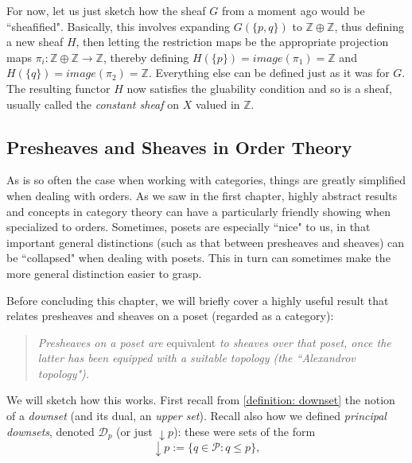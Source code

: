 \documentclass[11pt]{book}
\theoremstyle{definition}
\theoremstyle{definition}
\theoremstyle{definition}
\theoremstyle{theorem}
\theoremstyle{definition}
\begin{document}
For now, let us just sketch how the sheaf $G$ from a moment ago would be ``sheafified". Basically, this involves expanding $G(\{p,q\})$ to $\mathbb{Z} \oplus \mathbb{Z}$, thus defining a new sheaf $H$, then letting the restriction maps be the appropriate projection maps $\pi_i: \mathbb{Z} \oplus \mathbb{Z} \rightarrow \mathbb{Z}$, thereby defining $H(\{p\}) = image(\pi_1) = \mathbb{Z}$ and $H(\{q\}) = image(\pi_2) = \mathbb{Z}$. Everything else can be defined just as it was for $G$. The resulting functor $H$ now satisfies the gluability condition and so is a sheaf, usually called the \textit{constant sheaf} on $X$ valued in $\mathbb{Z}$.  
\subsection{Presheaves and Sheaves in Order Theory}
As is so often the case when working with categories, things are greatly simplified when dealing with orders. As we saw in the first chapter, highly abstract results and concepts in category theory can have a particularly friendly showing when specialized to orders. Sometimes, posets are especially ``nice" to us, in that important general distinctions (such as that between presheaves and sheaves) can be ``collapsed" when dealing with posets. This in turn can sometimes make the more general distinction easier to grasp. \par 
Before concluding this chapter, we will briefly cover a highly useful result that relates presheaves and sheaves on a poset (regarded as a category):  
\begin{quote}
	\textit{Presheaves on a poset are} equivalent \textit{to sheaves over that poset, once the latter has been equipped with a suitable topology (the ``Alexandrov topology").} 
\end{quote}
We will sketch how this works. First recall from \ref{definition: downset} the notion of a \textit{downset} (and its dual, an \textit{upper set}). Recall also how we defined \textit{principal downsets}, denoted $\mathcal{D}_p$ (or just $\downarrow p$): these were sets of the form 
\begin{equation*}
\downarrow p := \{q \in \mathcal{P}: q \leq p \},  
\end{equation*}
\end{document}

